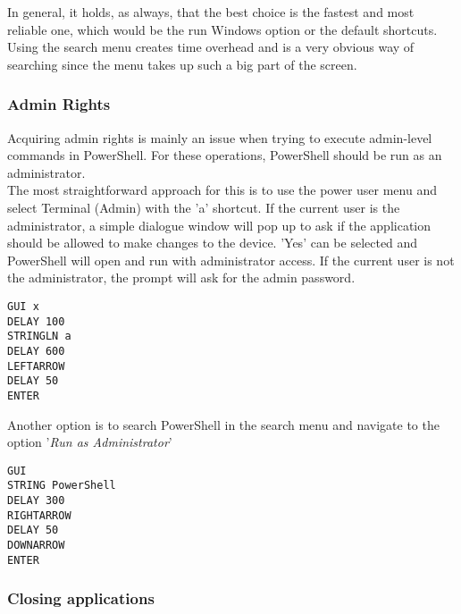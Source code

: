 In general, it holds, as always, that the best choice is the fastest and most reliable one, which would be the run Windows option or the default shortcuts. Using the search menu creates time overhead and is a very obvious way of searching since the menu takes up such a big part of the screen. 

\subsubsection{Admin Rights}

Acquiring admin rights is mainly an issue when trying to execute admin-level commands in PowerShell. For these operations, PowerShell should be run as an administrator. \\
The most straightforward approach for this is to use the power user menu and select Terminal (Admin) with the 'a' shortcut. If the current user is the administrator, a simple dialogue window will pop up to ask if the application should be allowed to make changes to the device. 'Yes' can be selected and PowerShell will open and run with administrator access. If the current user is not the administrator, the prompt will ask for the admin password. \\
\begin{lstlisting}[caption={Open terminal with admin rights via the Power User Menu}, captionpos=b]
GUI x
DELAY 100
STRINGLN a
DELAY 600
LEFTARROW
DELAY 50
ENTER
\end{lstlisting}

Another option is to search PowerShell in the search menu and navigate to the option '\textit{Run as Administrator}' \\
\begin{lstlisting}[caption={Open PowerShell with admin rights via Search Menu}, captionpos=b]
GUI
STRING PowerShell
DELAY 300
RIGHTARROW
DELAY 50
DOWNARROW
ENTER
\end{lstlisting}

\subsubsection{Closing applications}

